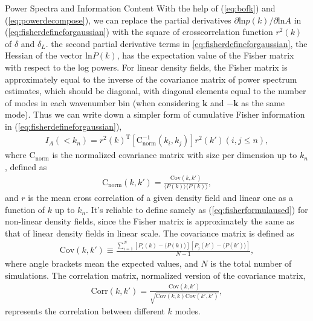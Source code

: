 \begin{section}{Power Spectra and Information Content}
   With the help of (\ref{eq:bofk}) and (\ref{eq:powerdecompose}), we can replace the partial derivatives 
$\partial \mathrm{ln} p(k) / \partial \mathrm{ln} A$ in (\ref{eq:fisherdefineforgaussian}) with the square of 
crosscorrelation function $r ^2 (k)$ of $\delta$ and $\delta_L$. the second partial derivative terms in 
\ref{eq:fisherdefineforgaussian}, the Hessian of the vector $\mathrm{ln} P(k)$, has the expectation 
value of the Fisher matrix with respect to the log powers. For linear density fields, the Fisher matrix is 
approximately equal to the inverse of the covariance matrix of power spectrum estimates, which should be diagonal, 
with diagonal elements equal to the number of modes in each wavenumber bin (when considering $\bm{k}$ and $-\bm{k}$ 
as the same mode). Thus we can write down a simpler form of cumulative Fisher information in (\ref{eq:fisherdefineforgaussian}), 
\begin{align}
    I_A \left( < k_n\right) = r^2(k)^{\mathrm{T}} \left[ \mathrm{C^{-1}_{norm}} ( k_i,k_j )\right] r^2(k')( i,j \leq n ) ,
\label{eq:fisherformulaused}
\end{align}
where $\mathrm{C_{norm}}$ is the normalized covariance matrix with size per dimension up to $k_n$, defined as
\begin{align}
    \mathrm{C_{norm}} \left( k,k' \right)=\frac{\mathrm{Cov}(k,k')}{\langle P(k)\rangle\langle P(k)\rangle},
\end{align}
and $r$ is the mean cross correlation of a given density field and linear one as a function of $k$ up to $k_n$. 
It's reliable to define samely as (\ref{eq:fisherformulaused}) for non-linear density fields, 
since the Fisher matrix is approximately the same as that of linear density fields in linear scale. 
The covariance matrix is defined as 
\begin{align}
    \mathrm{Cov}\left(k,k'\right)\equiv \frac{\sum_{i=1}^{N}\left[ P_i \left( k \right) - 
\langle P \left( k \right) \rangle \right]\left[ P_j \left( k' \right) - \langle P \left( k' \right)\rangle \right]}{N-1},
\end{align}
where angle brackets mean the expected values, and $N$ is the total number of simulations.
    The  correlation matrix, normalized version of the covariance matrix,
\begin{align}
    \mathrm{Corr}\left(k,k'\right)=\frac{\mathrm{Cov}\left(k,k'\right)}{\sqrt{\mathrm{Cov}\left(k,k\right)\mathrm{Cov}\left(k',k'\right)}},
\end{align}
represents the correlation between different $k$ modes. 

\end{section}
